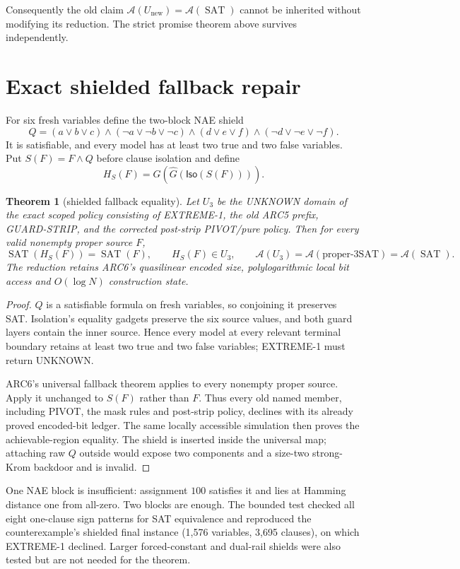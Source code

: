 \documentclass[11pt]{article}
\newtheorem{theorem}{Theorem}
\newcommand{\SAT}{\operatorname{SAT}}
\newcommand{\A}{\mathcal A}
\begin{document}
Consequently the old claim
$\A(U_{\mathrm{new}})=\A(\SAT)$ cannot be inherited without modifying its
reduction.  The strict promise theorem above survives independently.

\section{Exact shielded fallback repair}

For six fresh variables define the two-block NAE shield
\[
Q=(a\vee b\vee c)\wedge(\neg a\vee\neg b\vee\neg c)\wedge
  (d\vee e\vee f)\wedge(\neg d\vee\neg e\vee\neg f).
\]
It is satisfiable, and every model has at least two true and two false
variables.  Put $S(F)=F\wedge Q$ before clause isolation and define
\[
H_S(F)=G(\widehat G(\mathsf{Iso}(S(F)))).
\]

\begin{theorem}[shielded fallback equality]
Let $U_3$ be the UNKNOWN domain of the exact scoped policy consisting of
\textsc{EXTREME-1}, the old ARC5 prefix, GUARD-STRIP, and the corrected
post-strip PIVOT/pure policy.  Then for every valid nonempty proper source
$F$,
\[
\SAT(H_S(F))=\SAT(F),\qquad H_S(F)\in U_3,
\qquad \A(U_3)=\A(\text{proper-3SAT})=\A(\SAT).
\]
The reduction retains ARC6's quasilinear encoded size, polylogarithmic local
bit access and $O(\log N)$ construction state.
\end{theorem}
\begin{proof}
$Q$ is a satisfiable formula on fresh variables, so conjoining it preserves
SAT.  Isolation's equality gadgets preserve the six source values, and both
guard layers contain the inner source.  Hence every model at every relevant
terminal boundary retains at least two true and two false variables;
\textsc{EXTREME-1} must return UNKNOWN.

ARC6's universal fallback theorem applies to every nonempty proper source.
Apply it unchanged to $S(F)$ rather than $F$.  Thus every old named member,
including PIVOT, the mask rules and post-strip policy, declines with its
already proved encoded-bit ledger.  The same locally accessible simulation
then proves the achievable-region equality.  The shield is inserted inside
the universal map; attaching raw $Q$ outside would expose two components and
a size-two strong-Krom backdoor and is invalid.
\end{proof}

One NAE block is insufficient: assignment $100$ satisfies it and lies at
Hamming distance one from all-zero.  Two blocks are enough.  The bounded test
checked all eight one-clause sign patterns for SAT equivalence and reproduced
the counterexample's shielded final instance (1,576 variables, 3,695 clauses),
on which \textsc{EXTREME-1} declined.  Larger forced-constant and dual-rail
shields were also tested but are not needed for the theorem.
\end{document}
